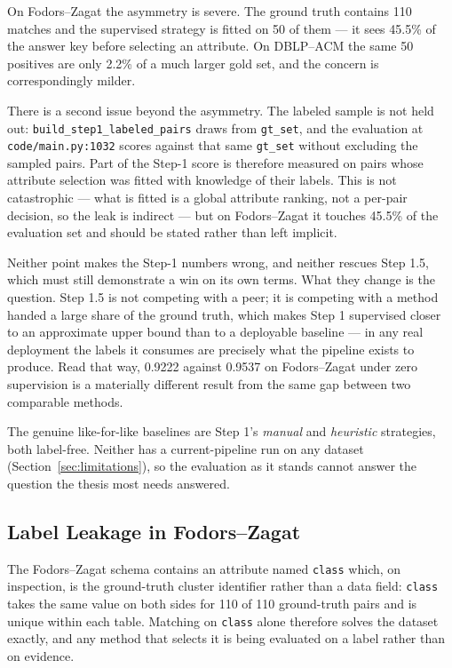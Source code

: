 \documentclass[11pt]{article}
\begin{document}
On Fodors--Zagat the asymmetry is severe. The ground truth contains 110 matches and
the supervised strategy is fitted on 50 of them --- it sees 45.5\% of the answer key
before selecting an attribute. On DBLP--ACM the same 50 positives are only 2.2\% of a
much larger gold set, and the concern is correspondingly milder.

There is a second issue beyond the asymmetry. The labeled sample is not held out:
\texttt{build\_step1\_labeled\_pairs} draws from \texttt{gt\_set}, and the evaluation
at \texttt{code/main.py:1032} scores against that same \texttt{gt\_set} without
excluding the sampled pairs. Part of the Step-1 score is therefore measured on pairs
whose attribute selection was fitted with knowledge of their labels. This is not
catastrophic --- what is fitted is a global attribute ranking, not a per-pair decision,
so the leak is indirect --- but on Fodors--Zagat it touches 45.5\% of the evaluation
set and should be stated rather than left implicit.

Neither point makes the Step-1 numbers wrong, and neither rescues Step 1.5, which must
still demonstrate a win on its own terms. What they change is the question. Step 1.5
is not competing with a peer; it is competing with a method handed a large share of
the ground truth, which makes Step 1 supervised closer to an approximate upper bound
than to a deployable baseline --- in any real deployment the labels it consumes are
precisely what the pipeline exists to produce. Read that way, 0.9222 against 0.9537 on
Fodors--Zagat under zero supervision is a materially different result from the same
gap between two comparable methods.

The genuine like-for-like baselines are Step 1's \emph{manual} and \emph{heuristic}
strategies, both label-free. Neither has a current-pipeline run on any dataset
(Section~\ref{sec:limitations}), so the evaluation as it stands cannot answer the
question the thesis most needs answered.

\subsection{Label Leakage in Fodors--Zagat}
\label{sec:leakage}

The Fodors--Zagat schema contains an attribute named \texttt{class} which, on
inspection, is the ground-truth cluster identifier rather than a data field:
\texttt{class} takes the same value on both sides for 110 of 110 ground-truth pairs
and is unique within each table. Matching on \texttt{class} alone therefore solves
the dataset exactly, and any method that selects it is being evaluated on a label
rather than on evidence.
\end{document}
